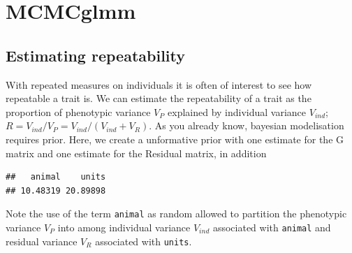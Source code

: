 \documentclass[
  12pt,
]{book}
\newenvironment{Shaded}{\begin{snugshade}}{\end{snugshade}}
\newcommand{\CommentTok}[1]{\textcolor[rgb]{0.56,0.35,0.01}{\textit{#1}}}
\newcommand{\DataTypeTok}[1]{\textcolor[rgb]{0.13,0.29,0.53}{#1}}
\newcommand{\DecValTok}[1]{\textcolor[rgb]{0.00,0.00,0.81}{#1}}
\newcommand{\FloatTok}[1]{\textcolor[rgb]{0.00,0.00,0.81}{#1}}
\newcommand{\KeywordTok}[1]{\textcolor[rgb]{0.13,0.29,0.53}{\textbf{#1}}}
\newcommand{\NormalTok}[1]{#1}
\newcommand{\OperatorTok}[1]{\textcolor[rgb]{0.81,0.36,0.00}{\textbf{#1}}}
\newcommand{\OtherTok}[1]{\textcolor[rgb]{0.56,0.35,0.01}{#1}}
\newcommand{\StringTok}[1]{\textcolor[rgb]{0.31,0.60,0.02}{#1}}
\begin{document}
\hypertarget{mcmcglmm-3}{%
\section{MCMCglmm}\label{mcmcglmm-3}}

\hypertarget{estimating-repeatability-1}{%
\subsection{Estimating repeatability}\label{estimating-repeatability-1}}

With repeated measures on individuals it is often of interest to see how repeatable a trait is.
We can estimate the repeatability of a trait as the proportion of phenotypic variance \(V_P\) explained by individual variance \(V_{ind}\); \(R = V_{ind}/V_P = V_{ind}/(V_{ind}+V_R)\).
As you already know, bayesian modelisation requires prior. Here, we create a unformative prior with one estimate for the G matrix and one estimate for the Residual matrix, in addition

\begin{Shaded}
\end{Shaded}

\begin{verbatim}
##   animal    units 
## 10.48319 20.89898
\end{verbatim}

Note the use of the term \texttt{animal} as random allowed to partition the phenotypic variance \(V_P\) into among individual variance \(V_{ind}\) associated with \texttt{animal} and residual variance \(V_R\) associated with \texttt{units}.
\end{document}

